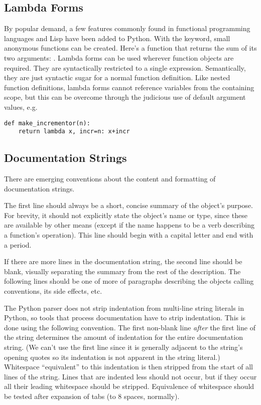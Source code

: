 \documentclass{manual}
\begin{document}
\subsection{Lambda Forms}
\label{lambda}

By popular demand, a few features commonly found in functional
programming languages and Lisp have been added to Python.  With the
 keyword, small anonymous functions can be created.
Here's a function that returns the sum of its two arguments:
.  Lambda forms can be used wherever function
objects are required.  They are syntactically restricted to a single
expression.  Semantically, they are just syntactic sugar for a normal
function definition.  Like nested function definitions, lambda forms
cannot reference variables from the containing scope, but this can be
overcome through the judicious use of default argument values, e.g.

\begin{verbatim}
def make_incrementor(n):
    return lambda x, incr=n: x+incr
\end{verbatim}

\subsection{Documentation Strings}
\label{docstrings}

There are emerging conventions about the content and formatting of
documentation strings.

The first line should always be a short, concise summary of the
object's purpose.  For brevity, it should not explicitly state the
object's name or type, since these are available by other means
(except if the name happens to be a verb describing a function's
operation).  This line should begin with a capital letter and end with
a period.

If there are more lines in the documentation string, the second line
should be blank, visually separating the summary from the rest of the
description.  The following lines should be one of more of paragraphs
describing the objects calling conventions, its side effects, etc.

The Python parser does not strip indentation from multi-line string
literals in Python, so tools that process documentation have to strip
indentation.  This is done using the following convention.  The first
non-blank line \emph{after} the first line of the string determines the
amount of indentation for the entire documentation string.  (We can't
use the first line since it is generally adjacent to the string's
opening quotes so its indentation is not apparent in the string
literal.)  Whitespace ``equivalent'' to this indentation is then
stripped from the start of all lines of the string.  Lines that are
indented less should not occur, but if they occur all their leading
whitespace should be stripped.  Equivalence of whitespace should be
tested after expansion of tabs (to 8 spaces, normally).
\end{document}
